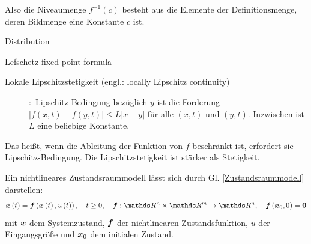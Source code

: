 \vspace{-0.8em}
Also die Niveaumenge $f^{-1}\left ( c \right )$ besteht aus die Elemente der Definitionsmenge, deren Bildmenge eine Konstante $c$ ist.
\begin{description}
\item[Distribution]
\end{description}
\begin{description}
\item[Lefschetz-fixed-point-formula]
\end{description}
\begin{description}
\item[Lokale Lipschitzstetigkeit (engl.: locally Lipschitz continuity)]
\cite[S.553]{bronstein2012taschenbuch}:~Lipschitz-Bedingung bezüglich $y$ ist die Forderung $\left | f\left ( x,t \right ) -f\left ( y,t \right )\right |\leq L\left | x-y \right |$ für alle $\left ( x,t \right )$ und $\left ( y,t \right )$. Inzwischen ist $L$ eine beliebige Konstante.
\end{description}
\vspace{-0.8em}
Das heißt, wenn die Ableitung der Funktion von $f$ beschränkt ist, erfordert sie Lipschitz-Bedingung. Die Lipschitzstetigkeit ist stärker als Stetigkeit.












Ein nichtlineares Zustandsraummodell lässt sich durch Gl. \ref{Zustandsraummodell} darstellen:
\begin{eqnarray}
\dot{\vect{x}}\left ( t \right )=\vect{f}\left (\vect{x}\left ( t \right ),u\left ( t \right )  \right ),~~~t\geq 0,~~~\vect{f}:\Reals^{n}\times\Reals^{m}\to\Reals^{n},~~~\vect{f}\left ({\vect{x}_{0}},0  \right )=\vect{0}
\label{Zustandsraummodell}
\end{eqnarray}
mit $\boldsymbol x$ dem Systemzustand, $\boldsymbol f$ der nichtlinearen Zustandsfunktion, $u$ der Eingangsgröße und $\boldsymbol x_{0}$ dem initialen Zustand. 

